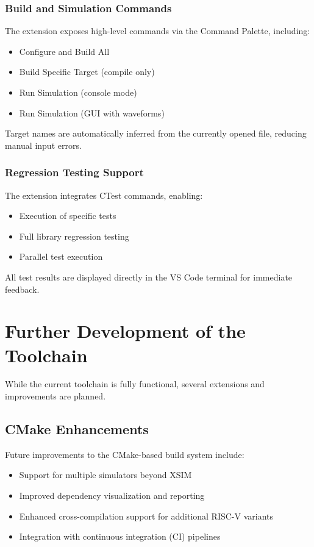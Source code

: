 \subsubsection{Build and Simulation Commands}

The extension exposes high-level commands via the Command Palette, including:
\begin{itemize}
    \item Configure and Build All
    \item Build Specific Target (compile only)
    \item Run Simulation (console mode)
    \item Run Simulation (GUI with waveforms)
\end{itemize}

Target names are automatically inferred from the currently opened file, reducing manual input errors.

\subsubsection{Regression Testing Support}

The extension integrates CTest commands, enabling:
\begin{itemize}
    \item Execution of specific tests
    \item Full library regression testing
    \item Parallel test execution
\end{itemize}

All test results are displayed directly in the VS Code terminal for immediate feedback.

\section{Further Development of the Toolchain}

While the current toolchain is fully functional, several extensions and improvements are planned.

\subsection{CMake Enhancements}

Future improvements to the CMake-based build system include:
\begin{itemize}
    \item Support for multiple simulators beyond XSIM
    \item Improved dependency visualization and reporting
    \item Enhanced cross-compilation support for additional RISC-V variants
    \item Integration with continuous integration (CI) pipelines
\end{itemize}

